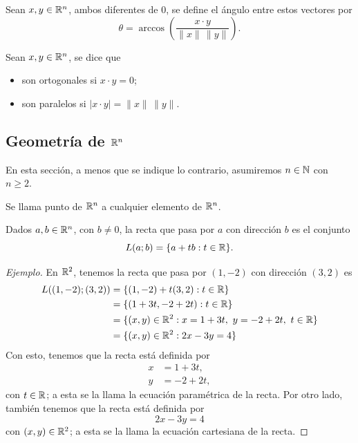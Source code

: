 \documentclass[a4,11pt]{aleph-notas}
\begin{document}
    

\begin{defi}
    Sean $x,y\in\mathbb{R}^n$, ambos diferentes de 0, se define el ángulo entre estos vectores por
    \[
       \theta =  \arccos\left( \frac{x\cdot y}{\|x\|\,\|y\|} \right).
    \]
\end{defi}

\begin{defi}
    Sean $x,y\in\mathbb{R}^n$, se dice que 
    \begin{itemize}
    \item 
        son ortogonales si $x\cdot y =0$;
    \item
        son paralelos si $|x\cdot y| = \|x\|\,\|y\|$.
    \end{itemize}
\end{defi}

\subsection{Geometría de $\R^n$}

En esta sección, a menos que se indique lo contrario, asumiremos $n\in\mathbb{N}$ con $n\geq 2$.

\begin{defi}[Puntos de $\R^n$]
    Se llama punto de $\R^n$ a cualquier elemento de $\R^n$. 
\end{defi}


\begin{defi}[Recta de $\R^n$]
    Dados $a,b\in\mathbb{R}^n$, con $b\neq0$, la recta que pasa por $a$ con dirección $b$ es el conjunto
    \[
        L(a;b)=\{a+t b:t\in\mathbb{R}\}.
    \]
\end{defi}

\begin{proof}[Ejemplo]
    En $\mathbb{R}^2$, tenemos la recta que pasa por $(1,-2)$ con dirección $(3,2)$ es
    \begin{align*}
        L((1,-2);(3,2)) 
            & = \{(1,-2)+t(3,2):t \in\mathbb{R}\} \\
            & = \{(1+3t ,-2+2t ): t \in\mathbb{R}\} \\
            & = \{(x,y)\in\mathbb{R}^2: x = 1+3t ,\ y=-2+2t ,\ t \in\mathbb{R}\} \\
            & = \{(x,y)\in\mathbb{R}^2: 2x-3y=4\}
    \end{align*}
    Con esto, tenemos que la recta está definida por
    \begin{align*}
        x& = 1+3t ,\\
        y& = -2+2t ,
    \end{align*}
    con $t \in \mathbb{R}$; a esta se la llama la ecuación paramétrica de la recta. Por otro lado, también tenemos que la recta está definida por 
    \[
        2x-3y=4
    \]
    con $(x,y)\in\mathbb{R}^2$; a esta se la llama la ecuación cartesiana de la recta.
\end{proof}
\end{document}

